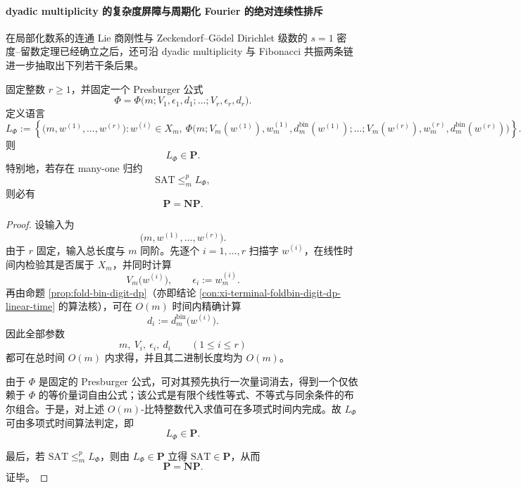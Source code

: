 \paragraph{dyadic multiplicity 的复杂度屏障与周期化 Fourier 的绝对连续性排斥}
在局部化数系的连通 Lie 商刚性与 Zeckendorf--Gödel Dirichlet 级数的 \(s=1\) 密度--留数定理已经确立之后，还可沿 dyadic multiplicity 与 Fibonacci 共振两条链进一步抽取出下列若干条后果。

\begin{theorem}\label{thm:xi-fixed-arity-dyadic-multiplicity-presburger-in-p}
固定整数 \(r\ge 1\)，并固定一个 Presburger 公式
\[
\Phi=\Phi\bigl(m;V_1,\epsilon_1,d_1;\dots;V_r,\epsilon_r,d_r\bigr).
\]
定义语言
\[
L_\Phi
:=
\left\{
\bigl(m,w^{(1)},\dots,w^{(r)}\bigr):
w^{(i)}\in X_m,\ 
\Phi\!\bigl(m;V_m(w^{(1)}),w_m^{(1)},d_m^{\mathrm{bin}}(w^{(1)});\dots;V_m(w^{(r)}),w_m^{(r)},d_m^{\mathrm{bin}}(w^{(r)})\bigr)
\right\}.
\]
则
\[
L_\Phi\in \mathbf P.
\]
特别地，若存在 many-one 归约
\[
\mathrm{SAT}\le_m^p L_\Phi,
\]
则必有
\[
\mathbf P=\mathbf{NP}.
\]
\end{theorem}
\begin{proof}
设输入为
\[
\bigl(m,w^{(1)},\dots,w^{(r)}\bigr).
\]
由于 \(r\) 固定，输入总长度与 \(m\) 同阶。先逐个 \(i=1,\dots,r\) 扫描字 \(w^{(i)}\)，在线性时间内检验其是否属于 \(X_m\)，并同时计算
\[
V_m\bigl(w^{(i)}\bigr),
\qquad
\epsilon_i:=w_m^{(i)}.
\]
再由命题 \ref{prop:fold-bin-digit-dp}（亦即结论 \ref{con:xi-terminal-foldbin-digit-dp-linear-time} 的算法核），可在 \(O(m)\) 时间内精确计算
\[
d_i:=d_m^{\mathrm{bin}}\bigl(w^{(i)}\bigr).
\]
因此全部参数
\[
m,\ V_i,\ \epsilon_i,\ d_i
\qquad(1\le i\le r)
\]
都可在总时间 \(O(m)\) 内求得，并且其二进制长度均为 \(O(m)\)。

由于 \(\Phi\) 是固定的 Presburger 公式，可对其预先执行一次量词消去，得到一个仅依赖于 \(\Phi\) 的等价量词自由公式；该公式是有限个线性等式、不等式与同余条件的布尔组合。于是，对上述 \(O(m)\)-比特整数代入求值可在多项式时间内完成。故 \(L_\Phi\) 可由多项式时间算法判定，即
\[
L_\Phi\in\mathbf P.
\]

最后，若 \(\mathrm{SAT}\le_m^p L_\Phi\)，则由 \(L_\Phi\in \mathbf P\) 立得 \(\mathrm{SAT}\in \mathbf P\)，从而
\[
\mathbf P=\mathbf{NP}.
\]
证毕。
\end{proof}

